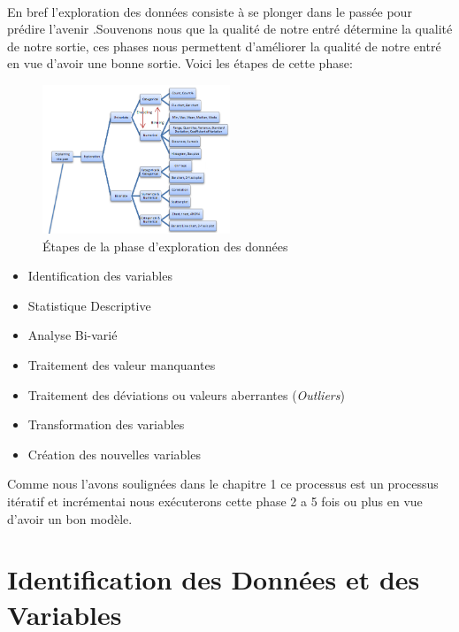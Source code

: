 \paragraph{}
En bref l'exploration des données consiste à se plonger dans le passée
pour prédire l'avenir .Souvenons nous que la qualité de notre entré
détermine la qualité de notre sortie, ces phases nous permettent
d'améliorer la qualité de notre entré en vue d'avoir une bonne sortie.
Voici les étapes de cette phase:
\begin{figure}[ht]
	\centering
	\includegraphics[width=0.5\textwidth]{fig/Exploration.png}
	\caption{Étapes de la phase d'exploration des données }
	\label{fig:imageExpSt}
\end{figure} 
\begin{itemize}
\item
  Identification des variables
\item
  Statistique Descriptive
\item
  Analyse Bi-varié
\item
  Traitement des valeur manquantes
\item
  Traitement des déviations  ou valeurs aberrantes (\emph{Outliers})  
\item
  Transformation des variables
\item
  Création des nouvelles variables
\end{itemize}
Comme nous l'avons soulignées dans le chapitre 1 ce processus est un
processus itératif et incrémentai nous exécuterons cette phase 2 a 5 fois ou plus en vue d'avoir un bon modèle.
\section{Identification des Données et des Variables}
